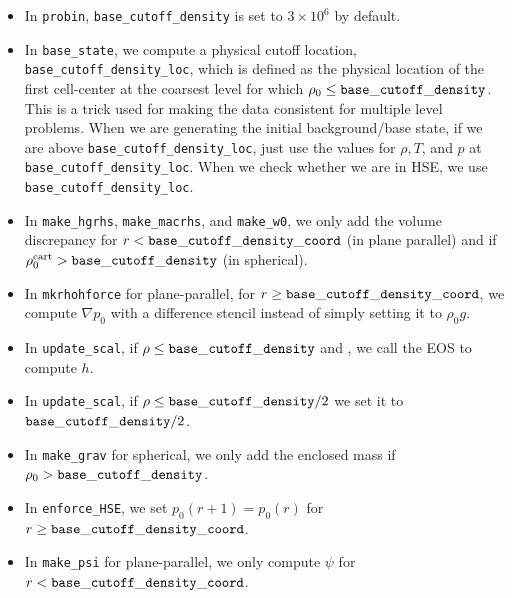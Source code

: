 \begin{itemize}

\item In {\tt probin}, {\tt base\_cutoff\_density} is set to $3\times 10^6$ by default.

\item In {\tt base\_state}, we compute a physical cutoff location,
  {\tt base\_cutoff\_density\_loc}, which is defined as the physical
  location of the first cell-center at the coarsest level for which
  $\rho_0 \le {\tt base\_cutoff\_density}$.  This is a trick used for making
  the data consistent for multiple level problems.  When we are generating the 
  initial background/base state, if we are above {\tt base\_cutoff\_density\_loc}, 
  just use the values for $\rho,T$, and $p$ at {\tt base\_cutoff\_density\_loc}.
  When we check whether we are in HSE, we use {\tt base\_cutoff\_density\_loc}.

\item In {\tt make\_hgrhs}, {\tt make\_macrhs}, and {\tt make\_w0}, 
  we only add the volume discrepancy for $r < {\tt base\_cutoff\_density\_coord}$
  (in plane parallel) and if $\rho_0^{\rm cart} > {\tt base\_cutoff\_density}$ 
  (in spherical).

\item In {\tt mkrhohforce} for plane-parallel, for
  $r \ge {\tt base\_cutoff\_density\_coord}$, we
  compute $\nabla p_0$ with a difference stencil instead of simply
  setting it to $\rho_0 g$.

\item In {\tt update\_scal}, if $\rho \le {\tt base\_cutoff\_density}$
   and , we call the EOS to compute $h$.

\item In {\tt update\_scal}, if $\rho \le {\tt base\_cutoff\_density}/2$
   we set it to ${\tt base\_cutoff\_density}/2$.

\item In {\tt make\_grav} for spherical, we only add the enclosed mass if
  $\rho_0 > {\tt base\_cutoff\_density}$.

\item In {\tt enforce\_HSE}, we set $p_0(r+1) = p_0(r)$ for 
  $r \ge {\tt base\_cutoff\_density\_coord}$.

\item In {\tt make\_psi} for plane-parallel, we only compute $\psi$ for 
  $r < {\tt base\_cutoff\_density\_coord}$.

\end{itemize}

